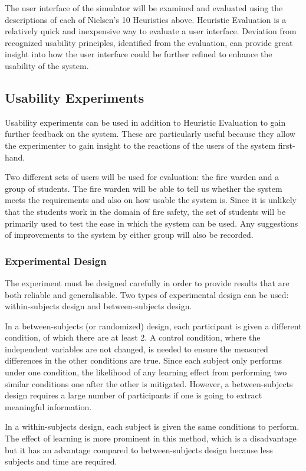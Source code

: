 The user interface of the simulator will be examined and evaluated using the descriptions of each of Nielsen’s 10 Heuristics above. Heuristic Evaluation is a relatively quick and inexpensive way to evaluate a user interface. Deviation from recognized usability principles, identified from the evaluation, can provide great insight into how the user interface could be further refined to enhance the usability of the system.

\subsection{Usability Experiments}
Usability experiments can be used in addition to Heuristic Evaluation to gain further feedback on the system. These are particularly useful because they allow the experimenter to gain insight to the reactions of the users of the system first-hand.

Two different sets of users will be used for evaluation: the fire warden and a group of students. The fire warden will be able to tell us whether the system meets the requirements and also on how usable the system is. Since it is unlikely that the students work in the domain of fire safety, the set of students will be primarily used to test the ease in which the system can be used. Any suggestions of improvements to the system by either group will also be recorded.

\subsubsection{Experimental Design}
The experiment must be designed carefully in order to provide results that are both reliable and generalisable. Two types of experimental design can be used: within-subjects design and between-subjects design.

In a between-subjects (or randomized) design, each participant is given a different condition, of which there are at least 2. A control condition, where the independent variables are not changed, is needed to ensure the measured differences in the other conditions are true. Since each subject only performs under one condition, the likelihood of any learning effect from performing two similar conditions one after the other is mitigated. However, a between-subjects design requires a large number of participants if one is going to extract meaningful information.

In a within-subjects design, each subject is given the same conditions to perform. The effect of learning is more prominent in this method, which is a disadvantage but it has an advantage compared to between-subjects design because less subjects and time are required.

